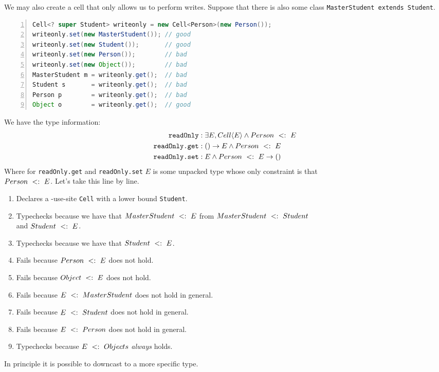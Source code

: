 \documentclass{article}
\begin{document}
\begin{example}
We may also create a \contra{} cell that only allows us to perform writes. Suppose that there is also some class \texttt{MasterStudent extends Student}.
\begin{lstlisting}[language=Java, numbers=left]
Cell<? super Student> writeonly = new Cell<Person>(new Person());
writeonly.set(new MasterStudent()); // good
writeonly.set(new Student());       // good
writeonly.set(new Person());        // bad
writeonly.set(new Object());        // bad
MasterStudent m = writeonly.get();  // bad
Student s       = writeonly.get();  // bad
Person p        = writeonly.get();  // bad
Object o        = writeonly.get();  // good
\end{lstlisting}

We have the type information:
\begin{align*}
\texttt{readOnly} &: \exists E, Cell \langle E \rangle \wedge Person ~ <: ~ E \\
\texttt{readOnly.get} &: () \rightarrow E \wedge Person ~ <: ~ E \\
\texttt{readOnly.set} &: E \wedge Person ~ <: ~ E \rightarrow ()
\end{align*}
Where for \texttt{readOnly.get} and \texttt{readOnly.set} $E$ is some unpacked type whose only constraint is that \\ $Person ~ <: ~ E$.
Let's take this line by line.

\begin{enumerate}
\item Declares a \contra{}-use-site \texttt{Cell} with a lower bound \texttt{Student}.
\item Typechecks because we have that $MasterStudent ~ <: ~ E$ from $MasterStudent ~ <: ~ Student$ \\ and $Student ~ <: ~ E$.
\item Typechecks because we have that $Student ~ <: ~ E$.
\item Fails because $Person ~ <: ~ E$ does not hold.
\item Fails because $Object ~ <: ~ E$ does not hold.
\item Fails because $E ~ <: ~ MasterStudent$ does not hold in general.
\item Fails because $E ~ <: ~ Student$ does not hold in general.
\item Fails because $E ~ <: ~ Person$ does not hold in general.
\item Typechecks because $E ~ <: ~ Objects$ \textit{always} holds.
\end{enumerate}
In principle it is possible to downcast to a more specific type.
\end{example}
\end{document}
